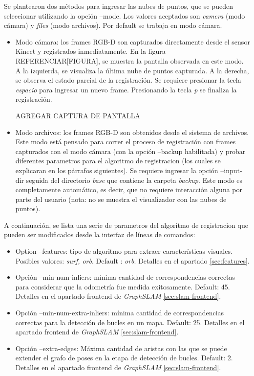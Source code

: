 Se plantearon dos métodos para ingresar las nubes de puntos, que se pueden seleccionar utilizando la opción --mode.
Los valores aceptados son \textsl{camera} (modo cámara) y \textsl{files} (modo archivos). Por default se trabaja en modo cámara.
\begin{itemize}

\item Modo cámara: los frames RGB-D son capturados directamente desde el sensor Kinect y registrados inmediatamente. En la figura REFERENCIAR[FIGURA], se muestra la pantalla observada en este modo. A la izquierda, se visualiza la última nube de puntos capturada. A la derecha, se observa el estado parcial de la registración. Se requiere presionar la tecla \textit{espacio} para ingresar un nuevo frame. Presionando la tecla \textit{p} se finaliza la registración.

AGREGAR CAPTURA DE PANTALLA

\item Modo archivos: los frames RGB-D son obtenidos desde el sistema de archivos. Este modo está pensado para correr el proceso de registración con frames capturados con el modo cámara (con la opción --backup habilitada) y probar diferentes parametros para el algoritmo de registracion (los cuales se explicaran en los párrafos siguientes). Se requiere ingresar la opción --input-dir seguida del directorio \textit{base} que contiene la carpeta \textit{backup}. Este modo es completamente automático, es decir, que no requiere interacción alguna por parte del usuario (nota: no se muestra el visualizador con las nubes de puntos).

\end{itemize}

A continuación, se lista una serie de parametros del algoritmo de registracion que pueden ser modificados desde la interfaz de líneas de comandos:

\begin{itemize}

\item Option --features: tipo de algoritmo para extraer características visuales. Posibles valores: \textsl{surf, orb}. Default : \textsl{orb}. Detalles en el apartado \ref{sec:features}.

\item Opción --min-num-inliers: mínima cantidad de correspondencias correctas para considerar que la odometría fue medida exitosamente. Default: 45. Detalles en el apartado frontend de \textit{GraphSLAM} \ref{sec:slam-frontend}.	

\item Opción --min-num-extra-inliers: mínima cantidad de correspondencias correctas para la detección de bucles en un mapa. Default: 25. Detalles en el apartado frontend de \textit{GraphSLAM} \ref{sec:slam-frontend}.

\item Opción --extra-edges: Máxima cantidad de aristas con las que se puede extender el grafo de poses en la etapa de detección de bucles. Default: 2. Detalles en el apartado frontend de \textit{GraphSLAM} \ref{sec:slam-frontend}.

\end{itemize}


